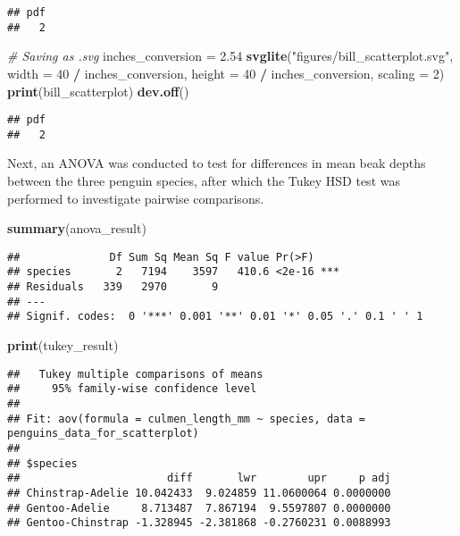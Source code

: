 \documentclass[
]{article}
\newenvironment{Shaded}{\begin{snugshade}}{\end{snugshade}}
\newcommand{\AttributeTok}[1]{\textcolor[rgb]{0.13,0.29,0.53}{#1}}
\newcommand{\CommentTok}[1]{\textcolor[rgb]{0.56,0.35,0.01}{\textit{#1}}}
\newcommand{\DecValTok}[1]{\textcolor[rgb]{0.00,0.00,0.81}{#1}}
\newcommand{\FloatTok}[1]{\textcolor[rgb]{0.00,0.00,0.81}{#1}}
\newcommand{\FunctionTok}[1]{\textcolor[rgb]{0.13,0.29,0.53}{\textbf{#1}}}
\newcommand{\NormalTok}[1]{#1}
\newcommand{\OtherTok}[1]{\textcolor[rgb]{0.56,0.35,0.01}{#1}}
\newcommand{\SpecialCharTok}[1]{\textcolor[rgb]{0.81,0.36,0.00}{\textbf{#1}}}
\newcommand{\StringTok}[1]{\textcolor[rgb]{0.31,0.60,0.02}{#1}}
\begin{document}
\begin{verbatim}
## pdf 
##   2
\end{verbatim}

\begin{Shaded}
\begin{Highlighting}[]
\CommentTok{\# Saving as .svg}
\NormalTok{inches\_conversion }\OtherTok{=} \FloatTok{2.54}
\FunctionTok{svglite}\NormalTok{(}\StringTok{"figures/bill\_scatterplot.svg"}\NormalTok{, }
        \AttributeTok{width =} \DecValTok{40} \SpecialCharTok{/}\NormalTok{ inches\_conversion, }
        \AttributeTok{height =} \DecValTok{40} \SpecialCharTok{/}\NormalTok{ inches\_conversion, }
        \AttributeTok{scaling =} \DecValTok{2}\NormalTok{)}
\FunctionTok{print}\NormalTok{(bill\_scatterplot)}
\FunctionTok{dev.off}\NormalTok{()}
\end{Highlighting}
\end{Shaded}

\begin{verbatim}
## pdf 
##   2
\end{verbatim}

Next, an ANOVA was conducted to test for differences in mean beak depths
between the three penguin species, after which the Tukey HSD test was
performed to investigate pairwise comparisons.

\begin{Shaded}
\begin{Highlighting}[]
\FunctionTok{summary}\NormalTok{(anova\_result)}
\end{Highlighting}
\end{Shaded}

\begin{verbatim}
##              Df Sum Sq Mean Sq F value Pr(>F)    
## species       2   7194    3597   410.6 <2e-16 ***
## Residuals   339   2970       9                   
## ---
## Signif. codes:  0 '***' 0.001 '**' 0.01 '*' 0.05 '.' 0.1 ' ' 1
\end{verbatim}

\begin{Shaded}
\begin{Highlighting}[]
\FunctionTok{print}\NormalTok{(tukey\_result)}
\end{Highlighting}
\end{Shaded}

\begin{verbatim}
##   Tukey multiple comparisons of means
##     95% family-wise confidence level
## 
## Fit: aov(formula = culmen_length_mm ~ species, data = penguins_data_for_scatterplot)
## 
## $species
##                       diff       lwr        upr     p adj
## Chinstrap-Adelie 10.042433  9.024859 11.0600064 0.0000000
## Gentoo-Adelie     8.713487  7.867194  9.5597807 0.0000000
## Gentoo-Chinstrap -1.328945 -2.381868 -0.2760231 0.0088993
\end{verbatim}
\end{document}
